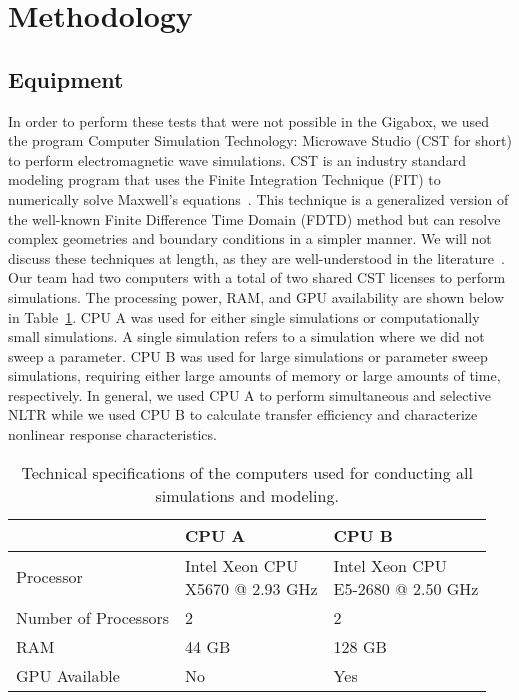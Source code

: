 \section{Methodology}
\label{sec:numerical-meth}

\subsection{Equipment}
In order to perform these tests that were not possible in the Gigabox, we used the program Computer Simulation Technology: Microwave Studio (CST for short) to perform electromagnetic wave simulations. CST is an industry standard modeling program that uses the Finite Integration Technique (FIT) to numerically solve Maxwell's equations~\cite{computersimulationtechnology}. This technique is a generalized version of the well-known Finite Difference Time Domain (FDTD) method but can resolve complex geometries and boundary conditions in a simpler manner. We will not discuss these techniques at length, as they are well-understood in the literature~\cite{schneider2010understanding,weiland2001discrete}.
Our team had two computers with a total of two shared CST licenses to perform simulations. The processing power, RAM, and GPU availability are shown below in Table~\ref{tab:numerical-cpu-specs}. CPU A was used for either single simulations or computationally small simulations. A single simulation refers to a simulation where we did not sweep a parameter.  CPU B was used for large simulations or parameter sweep simulations, requiring either large amounts of memory or large amounts of time, respectively. In general, we used CPU A to perform simultaneous and selective NLTR while we used CPU B to calculate transfer efficiency and characterize nonlinear response characteristics.

\def\arraystretch{2}
\begin{table}[h]
\centering
\begin{tabular}{|l|l|l|}
\hline
 & \textbf{CPU A} & \textbf{CPU B} \\ \hline
Processor & \rule{0pt}{2.5em}\shortstack{Intel Xeon CPU \\ X5670 @ 2.93 GHz} & \rule{0pt}{2.5em}\shortstack{Intel Xeon CPU \\ E5-2680 @ 2.50 GHz} \\ \hline
Number of Processors & 2 & 2 \\ \hline
RAM & 44 GB & 128 GB \\ \hline
GPU Available & No & Yes \\ \hline
\end{tabular}
\caption[Computer specifications]{Technical specifications of the computers used for conducting all simulations and modeling.}
\label{tab:numerical-cpu-specs}
\end{table}

